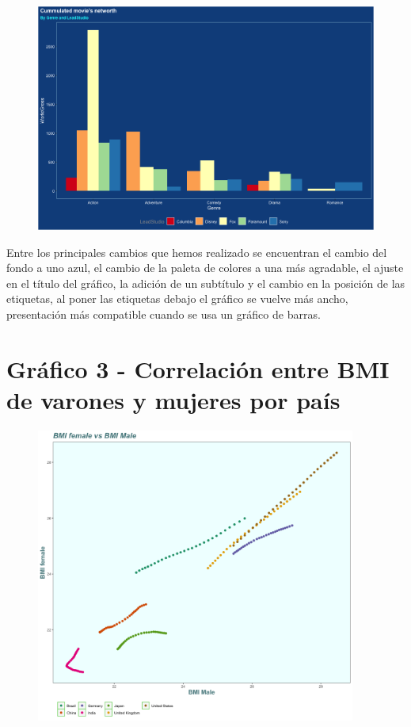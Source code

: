 \documentclass[11pt,a4paper]{article}
\begin{document}
\begin{figure}[!h]
    \centering
    \includegraphics[width=14cm]{new/graph2.png}
\end{figure}

Entre los principales cambios que hemos realizado se encuentran el cambio del fondo a uno azul, el cambio de la paleta de colores a una más agradable, el ajuste en el título del gráfico, la adición de un subtítulo y el cambio en la posición de las etiquetas, al poner las etiquetas debajo el gráfico se vuelve más ancho, presentación más compatible cuando se usa un gráfico de barras.

\clearpage
\section{Gráfico 3 - Correlación entre BMI de varones y mujeres por país}

\begin{figure}[!h]
    \centering
    \includegraphics[width=10.5cm]{old/graph3.png}
\end{figure}
\end{document}
